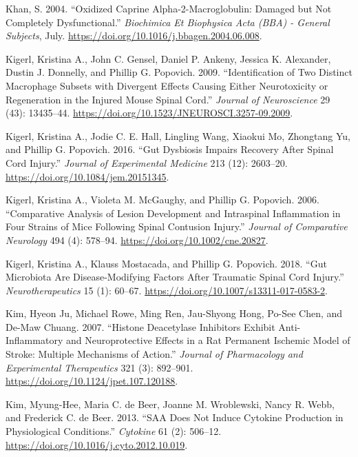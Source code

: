 \documentclass[9pt,lineno]{elife}
\newlength{\cslhangindent}
\newlength{\cslentryspacingunit} %
\newenvironment{CSLReferences}[2] %
 {%
  \setlength{\parindent}{0pt}
  \ifodd #1
  \let\oldpar\par
  \def\par{\hangindent=\cslhangindent\oldpar}
  \fi
  \setlength{\parskip}{#2\cslentryspacingunit}
 }%
 {}
\begin{document}
\begin{CSLReferences}{1}{0}
\leavevmode{}%
Khan, S. 2004. {``Oxidized Caprine Alpha-2-Macroglobulin: Damaged but Not Completely Dysfunctional.''} \emph{Biochimica Et Biophysica Acta (BBA) - General Subjects}, July. \url{https://doi.org/10.1016/j.bbagen.2004.06.008}.

\leavevmode{}%
Kigerl, Kristina A., John C. Gensel, Daniel P. Ankeny, Jessica K. Alexander, Dustin J. Donnelly, and Phillip G. Popovich. 2009. {``Identification of {Two Distinct Macrophage Subsets} with {Divergent Effects Causing} Either {Neurotoxicity} or {Regeneration} in the {Injured Mouse Spinal Cord}.''} \emph{Journal of Neuroscience} 29 (43): 13435--44. \url{https://doi.org/10.1523/JNEUROSCI.3257-09.2009}.

\leavevmode{}%
Kigerl, Kristina A., Jodie C. E. Hall, Lingling Wang, Xiaokui Mo, Zhongtang Yu, and Phillip G. Popovich. 2016. {``Gut Dysbiosis Impairs Recovery After Spinal Cord Injury.''} \emph{Journal of Experimental Medicine} 213 (12): 2603--20. \url{https://doi.org/10.1084/jem.20151345}.

\leavevmode{}%
Kigerl, Kristina A., Violeta M. McGaughy, and Phillip G. Popovich. 2006. {``Comparative Analysis of Lesion Development and Intraspinal Inflammation in Four Strains of Mice Following Spinal Contusion Injury.''} \emph{Journal of Comparative Neurology} 494 (4): 578--94. \url{https://doi.org/10.1002/cne.20827}.

\leavevmode{}%
Kigerl, Kristina A., Klauss Mostacada, and Phillip G. Popovich. 2018. {``Gut {Microbiota Are Disease-Modifying Factors After Traumatic Spinal Cord Injury}.''} \emph{Neurotherapeutics} 15 (1): 60--67. \url{https://doi.org/10.1007/s13311-017-0583-2}.

\leavevmode{}%
Kim, Hyeon Ju, Michael Rowe, Ming Ren, Jau-Shyong Hong, Po-See Chen, and De-Maw Chuang. 2007. {``Histone {Deacetylase Inhibitors Exhibit Anti-Inflammatory} and {Neuroprotective Effects} in a {Rat Permanent Ischemic Model} of {Stroke}: {Multiple Mechanisms} of {Action}.''} \emph{Journal of Pharmacology and Experimental Therapeutics} 321 (3): 892--901. \url{https://doi.org/10.1124/jpet.107.120188}.

\leavevmode{}%
Kim, Myung-Hee, Maria C. de Beer, Joanne M. Wroblewski, Nancy R. Webb, and Frederick C. de Beer. 2013. {``{SAA} Does Not Induce Cytokine Production in Physiological Conditions.''} \emph{Cytokine} 61 (2): 506--12. \url{https://doi.org/10.1016/j.cyto.2012.10.019}.


\end{CSLReferences}
\end{document}
